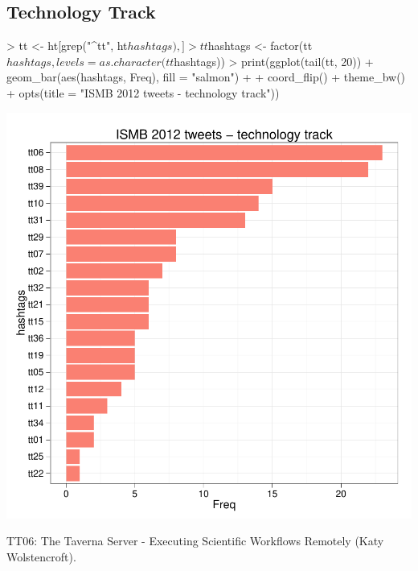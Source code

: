 \documentclass[a4paper,10pt]{article}
\begin{document}
\subsection{Technology Track}
\begin{center}
\begin{Schunk}
\begin{Sinput}
> tt <- ht[grep("^tt", ht$hashtags),]
> tt$hashtags <- factor(tt$hashtags, levels = as.character(tt$hashtags))
> print(ggplot(tail(tt, 20)) + geom_bar(aes(hashtags, Freq), fill = "salmon") + 
+   coord_flip() + theme_bw() + opts(title = "ISMB 2012 tweets - technology track"))
\end{Sinput}
\end{Schunk}
\includegraphics{ismb-008}
\end{center}

TT06: The Taverna Server - Executing Scientific Workflows Remotely (Katy Wolstencroft).

\newpage
\end{document}
